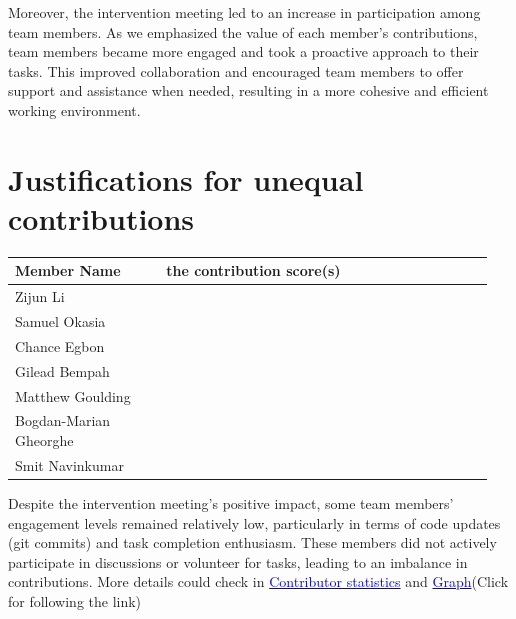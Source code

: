 \documentclass[a4paper]{article}
\begin{document}
Moreover, the intervention meeting led to an increase in participation among team members. As we emphasized the value of each member's contributions, team members became more engaged and took a proactive approach to their tasks. This improved collaboration and encouraged team members to offer support and assistance when needed, resulting in a more cohesive and efficient working environment.

\section*{Justifications for unequal contributions}

{\noindent\begin{tabular}{|p{0.3\linewidth}|p{0.65\linewidth}|} 
	\hline
 \textbf{Member Name} & \textbf{ the contribution score(s) } \\
 \hline
 Zijun Li & \\
 \hline
 Samuel Okasia & \\
 \hline
 Chance Egbon & \\
 \hline
 Gilead Bempah & \\
 \hline
 Matthew Goulding& \\
 \hline
 Bogdan-Marian Gheorghe & \\
 \hline
 Smit Navinkumar& \\
 \hline
\end{tabular}}

Despite the intervention meeting's positive impact, some team members' engagement levels remained relatively low, particularly in terms of code updates (git commits) and task completion enthusiasm. These members did not actively participate in discussions or volunteer for tasks, leading to an imbalance in contributions. More details could check in \href{https://git.cs.bham.ac.uk/team-projects-2022-23/team23-22/-/graphs/main?ref_type=heads}{\textcolor{blue}{Contributor statistics}} and \href{https://git.cs.bham.ac.uk/team-projects-2022-23/team23-22/-/network/main?ref_type=heads}{\textcolor{blue}{Graph}}(Click for following the link)
\end{document}
